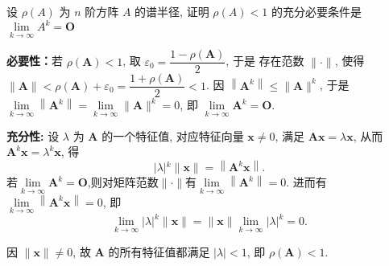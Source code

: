\begin{tcolorbox}[breakable,
		colframe=white!10!jingga, coltitle=white!90!jingga, colback=white!95!jingga, coltext=black, colbacktitle=white!10!jingga, enhanced, fonttitle=\bfseries,fontupper=\normalsize, attach boxed title to top left={yshift=-2mm}, before skip=8pt, after skip=8pt,
		title=解答题]


设 $ \rho(A) $ 为 $ {n} $ 阶方阵 $ A $ 的谱半径, 证明
$ \rho(A)<1 $ 的充分必要条件是 $ \lim\limits _{k \rightarrow \infty} A^{k}=\boldsymbol{O} $
 \tcblower

\textbf{必要性：}若 $ \rho(\boldsymbol{A})<1 $, 取 $ \varepsilon_{0}=\dfrac{1-\rho(\boldsymbol{A})}{2} $, 于是 存在范数 $ \|\cdot\| $, 使得 $ \|\boldsymbol{A}\|<\rho(\boldsymbol{A})+\varepsilon_{0}=\dfrac{1+\rho(\boldsymbol{A})}{2}<1 $. 因 $ \left\|\boldsymbol{A}^{k}\right\| \leqslant\|\boldsymbol{A}\|^{k} $, 于是 $ \lim\limits _{k \rightarrow \infty}\left\|\boldsymbol{A}^{k}\right\|=\lim \limits_{k \rightarrow \infty}\|\boldsymbol{A}\|^{k}=0 $, 即 $ \lim\limits _{k \rightarrow \infty} \boldsymbol{A}^{k}=\boldsymbol{O} $.

\textbf{充分性: }设 $ \lambda $ 为 $ \boldsymbol{A} $ 的一个特征值, 对应特征向量 $ \boldsymbol{x} \neq 0 $, 满足 $  \boldsymbol{Ax}=\lambda \boldsymbol{x} $, 从而 $ \boldsymbol{A}^{k} \boldsymbol{x}=\lambda^{k} \boldsymbol{x} $, 得
$$
|\lambda|{ }^{k}\|\boldsymbol{x}\|=\left\|\boldsymbol{A}^{k} \boldsymbol{x}\right\| .
$$
若$ \lim\limits _{k \rightarrow \infty} \boldsymbol{A}^{k}=\boldsymbol{O} $,则对矩阵范数$\|\cdot\|$有$ \lim\limits _{k \rightarrow \infty}\left\|\boldsymbol{A}^{k} \right\|=0 $. 进而有$ \lim\limits _{k \rightarrow \infty}\left\|\boldsymbol{A}^{k} \boldsymbol{x}\right\|=0 $, 即
$$
\lim _{k \rightarrow \infty}|\lambda|^{k}\|\boldsymbol{x}\|=\|\boldsymbol{x}\| \lim _{k \rightarrow \infty}|\lambda|^{k}=0 .
$$

因 $ \|\boldsymbol{x}\| \neq 0 $, 故 $ \boldsymbol{A} $ 的所有特征值都满足 $ |\lambda|<1 $, 即 $ \rho(\boldsymbol{A})<1 $.

\end{tcolorbox}


